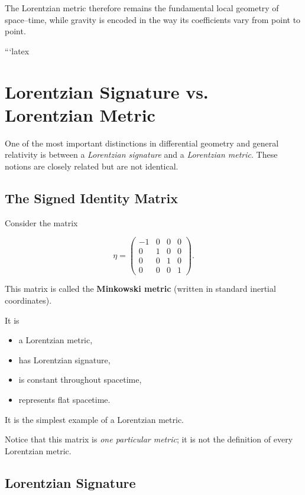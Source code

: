 \documentclass[12pt,a4paper]{article}
\theoremstyle{notespace}
\begin{document}
The Lorentzian metric therefore remains the fundamental local geometry
of space--time, while gravity is encoded in the way its coefficients vary
from point to point.

```latex
\section{Lorentzian Signature vs. Lorentzian Metric}

One of the most important distinctions in differential geometry and general relativity is between a \emph{Lorentzian signature} and a \emph{Lorentzian metric}. These notions are closely related but are not identical.

\subsection{The Signed Identity Matrix}

Consider the matrix

\[
\eta=
\begin{pmatrix}
	-1&0&0&0\\
	0&1&0&0\\
	0&0&1&0\\
	0&0&0&1
\end{pmatrix}.
\]

This matrix is called the \textbf{Minkowski metric} (written in standard inertial coordinates).

It is

\begin{itemize}
	\item a Lorentzian metric,
	\item has Lorentzian signature,
	\item is constant throughout spacetime,
	\item represents flat spacetime.
\end{itemize}

It is the simplest example of a Lorentzian metric.

\bigskip

Notice that this matrix is \emph{one particular metric}; it is not the definition of every Lorentzian metric.


\subsection{Lorentzian Signature}
\end{document}
